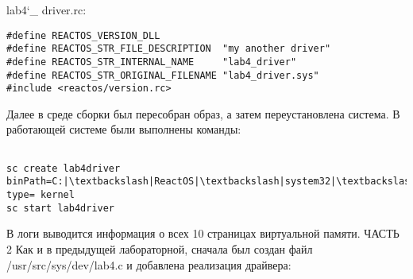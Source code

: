 \documentclass[a4paper, 14pt]{extarticle}
\begin{document}
\begin{flushleft}
lab4\char`_ driver.rc:
\end{flushleft}

\begin{verbatim}
#define REACTOS_VERSION_DLL
#define REACTOS_STR_FILE_DESCRIPTION  "my another driver"
#define REACTOS_STR_INTERNAL_NAME     "lab4_driver"
#define REACTOS_STR_ORIGINAL_FILENAME "lab4_driver.sys"
#include <reactos/version.rc>
\end{verbatim}

\begin{flushleft}
Далее в среде сборки был пересобран образ, а затем переустановлена система. В работающей системе были выполнены команды:
\end{flushleft}

\begin{verbatim}

sc create lab4driver binPath=C:|\textbackslash|ReactOS|\textbackslash|system32|\textbackslash|drivers|\textbackslash|lab4_driver.sys type= kernel
sc start lab4driver

\end{verbatim}

\begin{flushleft}
В логи выводится информация о всех 10 страницах виртуальной памяти. \newline \newline
ЧАСТЬ 2 \newline
Как и в предыдущей лабораторной, сначала был создан файл /usr/src/sys/dev/lab4.c и добавлена реализация драйвера:
\end{flushleft}
\end{document}
